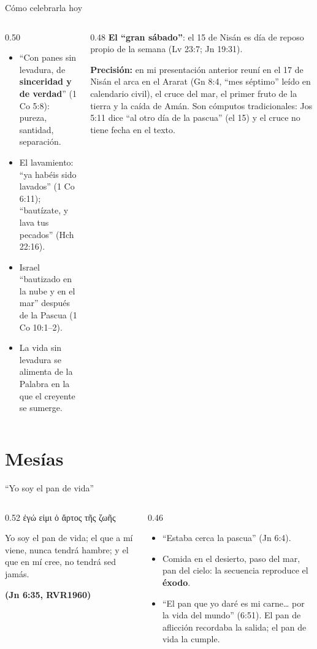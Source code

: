 \documentclass[hyperref={bookmarks=false},aspectratio=169]{beamer}
\newcommand{\grc}[1]{\foreignlanguage{ancientgreek}{#1}}
\newcommand{\fuente}[1]{\par\hfill{\upshape\bfseries\footnotesize\textcolor{tierraroja}{#1}}}
\newcommand{\destacar}[1]{\textbf{\textcolor{tierraroja}{#1}}}
\newcommand{\precision}[1]{{\footnotesize\color{sepia}\textbf{Precisión:} #1}}
\begin{document}
\begin{frame}{Cómo celebrarla hoy}
\begin{columns}[t,onlytextwidth]
\begin{column}{0.50\textwidth}\small
\begin{itemize}
\item ``Con panes sin levadura, de \destacar{sinceridad y de verdad}'' (1 Co 5:8): pureza, santidad, separación.
\item El lavamiento: ``ya habéis sido lavados'' (1 Co 6:11); ``bautízate, y lava tus pecados'' (Hch 22:16).
\item Israel ``bautizado en la nube y en el mar'' después de la Pascua (1 Co 10:1--2).
\item La vida sin levadura se alimenta de la Palabra en la que el creyente se sumerge.
\end{itemize}
\end{column}
\begin{column}{0.48\textwidth}\scriptsize
\destacar{El ``gran sábado''}: el 15 de Nisán es día de reposo propio de la semana (Lv 23:7; Jn 19:31).\par\medskip
\precision{en mi presentación anterior reuní en el 17 de Nisán el arca en el Ararat (Gn 8:4, ``mes séptimo'' leído en calendario civil), el cruce del mar, el primer fruto de la tierra y la caída de Amán. Son cómputos tradicionales: Jos 5:11 dice ``al otro día de la pascua'' (el 15) y el cruce no tiene fecha en el texto.}
\end{column}
\end{columns}
\end{frame}

\section{Mesías}

\begin{frame}{``Yo soy el pan de vida''}
\begin{columns}[t,onlytextwidth]
\begin{column}{0.52\textwidth}
\centering\grc{ἐγώ εἰμι ὁ ἄρτος τῆς ζωῆς}
\begin{cita}Yo soy el pan de vida; el que a mí viene, nunca tendrá hambre; y el que en mí cree, no tendrá sed jamás.\fuente{(Jn 6:35, RVR1960)}\end{cita}
\end{column}
\begin{column}{0.46\textwidth}\small
\begin{itemize}
\item ``Estaba cerca la pascua'' (Jn 6:4).
\item Comida en el desierto, paso del mar, pan del cielo: la secuencia reproduce el \destacar{éxodo}.
\item ``El pan que yo daré es mi carne\ldots{} por la vida del mundo'' (6:51). El pan de aflicción recordaba la salida; el pan de vida la cumple.
\end{itemize}
\end{column}
\end{columns}
\end{frame}
\end{document}

